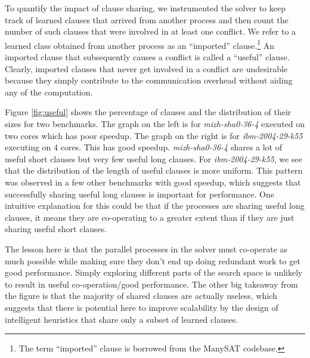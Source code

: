 \documentclass[letterpaper, compsoc, conference]{IEEEtran}
\begin{document}
To quantify the impact of clause sharing, we instrumented the solver to keep
track of learned clauses that arrived from another process and then count the
number of such clauses that were involved in at least one conflict.  We refer
to a learned class obtained from another process as an ``imported''
clause.\footnote{The term ``imported'' clause is borrowed from the ManySAT
codebase.} An imported clause that subsequently causes a conflict is called a
``useful'' clause. Clearly, imported clauses that never get involved in a
conflict are undesirable because they simply contribute to the communication
overhead without aiding any of the computation.

Figure \ref{fig:useful} shows the percentage of clauses and the distribution of
their sizes for two benchmarks. The graph on the left is for
\textit{mizh-sha0-36-4} executed on two cores which has poor speedup. The graph
on the right is for \textit{ibm-2004-29-k55} executing on 4 cores. This has
good speedup. \textit{mizh-sha0-36-4} shares a lot of useful short clauses but
very few useful long clauses. For \textit{ibm-2004-29-k55}, we see that the
distribution of the length of useful clauses is more uniform. This pattern was
observed in a few other benchmarks with good speedup, which suggests that
successfully sharing useful long clauses is important for performance. One
intuitive explanation for this could be that if the processes are sharing
useful long clauses, it means they are co-operating to a greater extent than if
they are just sharing useful short clauses. 

{The lesson here is that the parallel processes in the solver must co-operate
as much possible while making sure they don't end up doing redundant work to
get good performance.} Simply exploring different parts of the search space is
unlikely to result in useful co-operation/good performance. The other big
takeaway from the figure is that the majority of shared clauses are actually
useless, which suggests that there is potential here to improve scalability by
the design of intelligent heuristics that share only a subset of learned
clauses.
\end{document}
